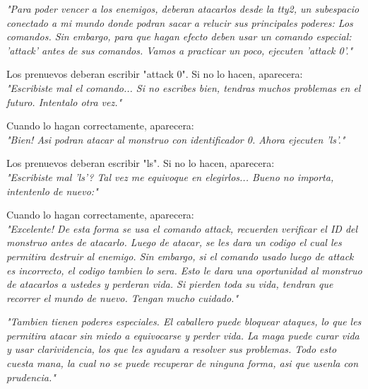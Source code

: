 \documentclass[a4paper,10pt]{article}
\begin{document}
	\hspace{-1cm}\textit{"Para poder vencer a los enemigos, deberan atacarlos desde la tty2, un subespacio conectado a mi mundo donde podran sacar a relucir sus principales poderes: Los comandos. Sin embargo, para que hagan efecto deben usar un comando especial: 'attack' antes de sus comandos. Vamos a practicar un poco, ejecuten 'attack 0'."\\}
	
	Los prenuevos deberan escribir "attack 0". Si no lo hacen, aparecera:\\
	
	\hspace{-1cm}\textit{"Escribiste mal el comando... Si no escribes bien, tendras muchos problemas en el futuro. Intentalo otra vez."\\}
	
	Cuando lo hagan correctamente, aparecera:\\
	
	\hspace{-1cm}\textit{"Bien! Asi podran atacar al monstruo con identificador 0. Ahora ejecuten 'ls'."\\}
	
	Los prenuevos deberan escribir "ls". Si no lo hacen, aparecera:\\
	
	\hspace{-1cm}\textit{"Escribiste mal 'ls'? Tal vez me equivoque en elegirlos... Bueno no importa, intentenlo de nuevo:"\\}
	
	Cuando lo hagan correctamente, aparecera:\\
	
	\hspace{-1cm}\textit{"Excelente! De esta forma se usa el comando attack, recuerden verificar el ID del monstruo antes de atacarlo. Luego de atacar, se les dara un codigo el cual les permitira destruir al enemigo. Sin embargo, si el comando usado luego de attack es incorrecto, el codigo tambien lo sera. Esto le dara una oportunidad al monstruo de atacarlos a ustedes y perderan vida. Si pierden toda su vida, tendran que recorrer el mundo de nuevo. Tengan mucho cuidado."\\}
	
	\hspace{-1cm}\textit{"Tambien tienen poderes especiales. El caballero puede bloquear ataques, lo que les permitira atacar sin miedo a equivocarse y perder vida. La maga puede curar vida y usar clarividencia, los que les ayudara a resolver sus problemas. Todo esto cuesta mana, la cual no se puede recuperar de ninguna forma, asi que usenla con prudencia."\\}
	
\end{document}
